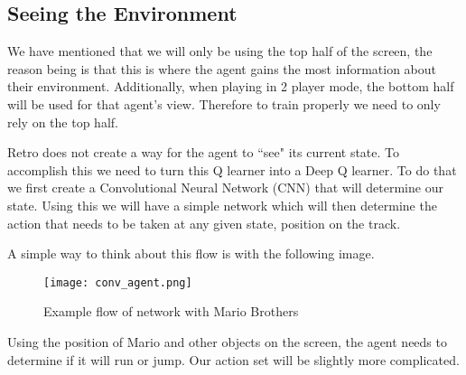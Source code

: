\documentclass[12pt,letter]{article}
\begin{document}
\subsection{Seeing the Environment}
We have mentioned that we will only be using the top half of the screen, the
reason being is that this is where the agent gains the most information about
their environment. Additionally, when playing in 2 player mode, the bottom half
will be used for that agent's view. Therefore to train properly we need to only
rely on the top half. 

Retro does not create a way for the agent to ``see" its current state. To 
accomplish this we need to turn this Q learner into a Deep Q learner. To do that
we first create a Convolutional Neural Network (CNN) that will determine our
state. Using this we will have a simple network which will then determine the
action that needs to be taken at any given state, position on the track. 

A simple way to think about this flow is with the following image.
\begin{figure}[h]
    \centering
    \texttt{[image: conv\_agent.png]}
    \caption{Example flow of network with Mario Brothers}
\end{figure}
Using the position of Mario and other objects on the screen, the agent needs
to determine if it will run or jump. Our action set will be slightly more
complicated. 
\end{document}
